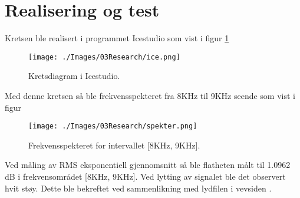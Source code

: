 \section{Realisering og test}
\label{sec:research}

Kretsen ble realisert i programmet Icestudio som vist i figur \ref{fig:ICE}

\begin{figure}[!hbt]
	\centering
	\texttt{[image: ./Images/03Research/ice.png]}
	\caption{Kretsdiagram i Icestudio.}
	\label{fig:ICE}
\end{figure}

Med denne kretsen så ble frekvensspekteret fra 8KHz til 9KHz seende som vist i figur 

\begin{figure}[!hbt]
	\centering
	\texttt{[image: ./Images/03Research/spekter.png]}
	\caption{Frekvensspekteret for intervallet [8KHz, 9KHz].}
	\label{fig:spekter}
\end{figure}

Ved måling av RMS eksponentiell gjennomsnitt så ble flatheten målt til 1.0962 dB i frekvensområdet [8KHz, 9KHz].
Ved lytting av signalet ble det observert hvit støy. Dette ble bekreftet ved sammenlikning med lydfilen i vevsiden \cite{wikipediacontributors_2022_white}.